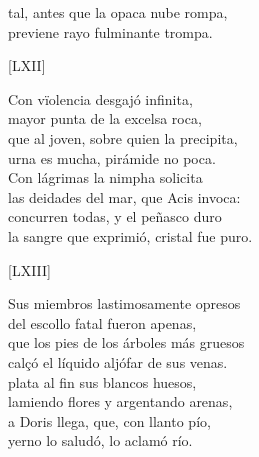 \documentclass[11pt,a4paper,twoside]{article}
\begin{document}
tal, antes que la opaca nube rompa,\\
previene rayo fulminante trompa.\par\pend
%
\begin{center}
	[LXII]
\end{center}\pstart
Con vïolencia desgajó infinita,\\
mayor punta de la excelsa roca,\\
que al joven, sobre quien la precipita,\\
urna es mucha, pirámide no poca.\\
Con lágrimas la nimpha solicita\\
las deidades del mar, que Acis invoca:\\
concurren todas, y el peñasco duro\\
la sangre que exprimió, cristal fue puro.\par\pend
%
\begin{center}
	[LXIII]
\end{center}\pstart
Sus miembros lastimosamente opresos\\
del escollo fatal fueron apenas,\\
que los pies de los árboles más gruesos\\
calçó el líquido aljófar de sus venas.\\
 plata al fin sus blancos huesos,\\
lamiendo flores y argentando arenas,\\
a Doris llega, que, con llanto pío,\\
yerno lo saludó, lo aclamó río.\par\pend
\endnumbering
\relax
\vfill
\end{document}
